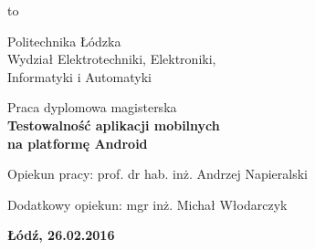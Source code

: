 \begin{titlepage}
    \vbox to \textheight
    {
        \begin{center}
            \begin{center}
                \LARGE
                Politechnika Łódzka \\
                Wydział Elektrotechniki, Elektroniki, \\
				Informatyki i Automatyki

            \end{center}

        \vspace*{3.75\baselineskip}
        \par\vspace{\smallskipamount}

        \vspace*{2\baselineskip}
        {\large
        Praca dyplomowa magisterska\\
        \huge\bfseries 
        Testowalność aplikacji mobilnych\\ na platformę Android\par}

        \vspace{2\baselineskip}{Rafał Sowiak\\Nr albumu: 199564\par}

        \vspace*{7\baselineskip}
        {Opiekun pracy: prof. dr hab. inż. Andrzej Napieralski\par}
        {Dodatkowy opiekun: mgr inż. Michał Włodarczyk\par}

        \vspace*{2\baselineskip}

        \begin{center}
            \textbf{Łódź, 26.02.2016}
        \end{center}

        \end{center}
    }
\end{titlepage}
